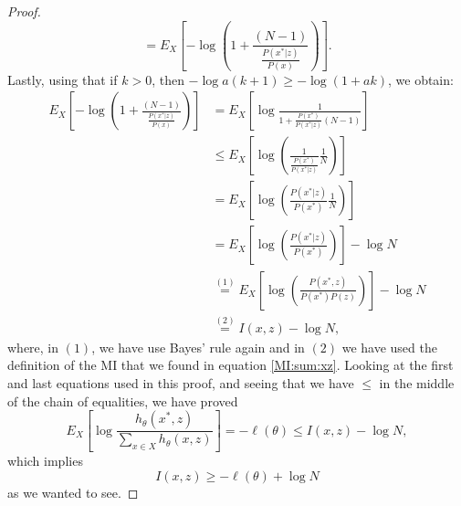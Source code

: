 \begin{proof}
\[= E_X\left[ -\log\left( 1+ \frac{ (N-1)}{\frac{P(x^*|z)}{P(x)}} \right)\right].
\] 
Lastly, using that if $k > 0$, then $- \log a(k+1) \geq -\log(1+ak)$, we obtain:
\begin{align*}
E_X\left[ -\log\left( 1+ \frac{ (N-1)}{\frac{P(x^*|z)} {P(x)}} \right)\right] &  =
E_X\left[ \log \frac{1}{ 1+ \frac{P(x^*)}{P(x^*|z)}(N-1)}\right] \\
& \leq E_X\left[ \log\left(\frac{1}{\frac{P(x^*)}{P(x^*|z)}}\frac{1}{N}\right)\right]\\
& = E_X\left[ \log\left(\frac{P(x^*|z)}{P(x^*)} \frac{1}{N}\right)\right]\\
& = E_X \left[ \log\left(\frac{P(x^*|z)}{P(x^*)}\right)\right] - \log N \\
& \stackrel{(1)}{=} E_X \left[ \log\left(\frac{P(x^*,z)}{P(x^*)P(z)}\right)\right] - \log N\\
& \stackrel{(2)}{=} I(x,z) - \log N,
\end{align*}
where, in $(1)$, we have use Bayes' rule again and in $(2)$ we have used the definition of the MI that we found in equation \ref{MI:sum:xz}. Looking at the first and last equations used in this proof, and seeing that we have $\leq$ in the middle of the chain of equalities, we have proved
\[
    E_X \left[ \log \frac{h_\theta(x^*,z)}{\sum_{x \in X}h_\theta(x,z)}\right] = - \ell (\theta) \leq I(x,z) - \log N,
\]
which implies 
\[
I(x,z) \geq -\ell(\theta)+ \log N  
\]
as we wanted to see.   
\end{proof}

